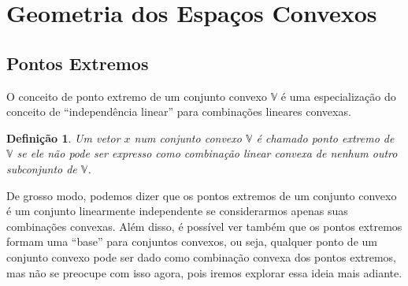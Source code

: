 \newtheorem{def:ponto extremo}[def:conjunto convexo]{Definição}

\newtheorem{def:raio}[def:conjunto convexo]{Definição}

\newtheorem{def:direção}[def:conjunto convexo]{Definição}

\newtheorem{def:direção extrema}[def:conjunto convexo]{Definição}

\newtheorem{def:ponto degenerado}[def:conjunto convexo]{Definição}

\newtheorem{def:face}[def:conjunto convexo]{Definição}


\newtheorem{prop:combinação convexa}{Proposição}[chapter]

\newtheorem{prop:hiperplano e ponto extremo}[prop:combinação convexa]{Proposição}

\newtheorem{prop:aresta}[prop:combinação convexa]{Proposição}


\newtheorem{thm:ponto extremo}{Teorema}[chapter]

\section{Geometria dos Espaços Convexos}

\subsection{Pontos Extremos}

O conceito de ponto extremo de um conjunto convexo $\mathbb{V}$ é uma especialização do conceito de ``independência linear'' para combinações lineares convexas.

\begin{def:ponto extremo}
	Um vetor $x$ num conjunto convexo $\mathbb{V}$ é chamado ponto extremo de $\mathbb{V}$ se ele não pode ser expresso como combinação linear convexa de nenhum outro subconjunto de $\mathbb{V}$. 
\end{def:ponto extremo}

De grosso modo, podemos dizer que os pontos extremos de um conjunto convexo é um conjunto linearmente independente se considerarmos apenas suas combinações convexas. Além disso, é possível ver também que os pontos extremos formam uma ``base'' para conjuntos convexos, ou seja, qualquer ponto de um conjunto convexo pode ser dado como combinação convexa dos pontos extremos, mas não se preocupe com isso agora, pois iremos explorar essa ideia mais adiante.

